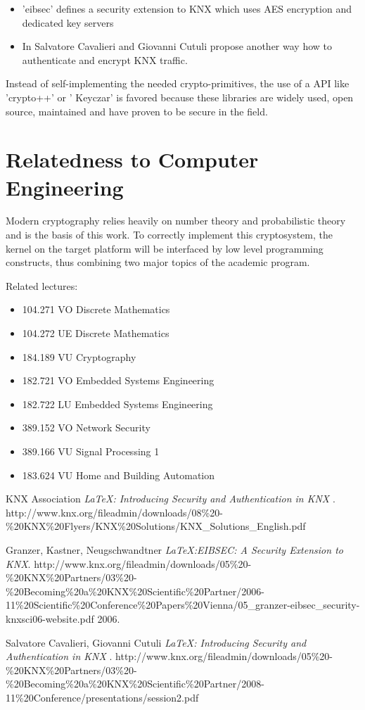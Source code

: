 \documentclass[a4paper,12pt,twoside]{memoir}
\begin{document}
\begin{itemize}
 \item 'eibsec'\cite{eibsec} defines a security extension to KNX which uses AES encryption and dedicated key
servers
 \item In \cite{knxsec}Salvatore Cavalieri and Giovanni Cutuli propose another way how to authenticate and
 encrypt KNX traffic.
\end{itemize}

Instead of self-implementing the needed crypto-primitives, the use of a API like 'crypto++' or ' Keyczar'
is favored because these libraries are widely used, open source, maintained and have proven to be secure
in the field. 

\section{Relatedness to Computer Engineering}

Modern cryptography relies heavily on number theory and probabilistic theory and is the basis of this work. 
To correctly implement this cryptosystem, the kernel on the target platform will be interfaced by low level
programming constructs, thus combining two major topics of the academic program.

Related lectures:

\begin{itemize}
 \item 104.271 VO Discrete Mathematics 
 \item 104.272 UE Discrete Mathematics 
 \item 184.189 VU Cryptography 
 \item 182.721 VO Embedded Systems Engineering 
 \item 182.722 LU Embedded Systems Engineering 
 \item 389.152 VO Network Security 
 \item 389.166 VU Signal Processing 1
 \item 183.624 VU Home and Building Automation 

\end{itemize}

\begin{thebibliography}{9}

  KNX Association
  \emph{\LaTeX: Introducing Security and Authentication in KNX }.
  http://www.knx.org/fileadmin/downloads/08\%20-\%20KNX\%20Flyers/KNX\%20Solutions/KNX\_Solutions\_English.pdf

  Granzer, Kastner, Neugschwandtner
  \emph{\LaTeX:EIBSEC: A Security Extension to KNX}.
  http://www.knx.org/fileadmin/downloads/05\%20-\%20KNX\%20Partners/03\%20-\%20Becoming\%20a\%20KNX\%20Scientific\%20Partner/2006-11\%20Scientific\%20Conference\%20Papers\%20Vienna/05\_granzer-eibsec\_security-knxsci06-website.pdf
  2006.

  Salvatore Cavalieri, Giovanni Cutuli
  \emph{\LaTeX: Introducing Security and Authentication in KNX }.
  http://www.knx.org/fileadmin/downloads/05\%20-\%20KNX\%20Partners/03\%20-\%20Becoming\%20a\%20KNX\%20Scientific\%20Partner/2008-11\%20Conference/presentations/session2.pdf  
  
\end{thebibliography}
\end{document}
